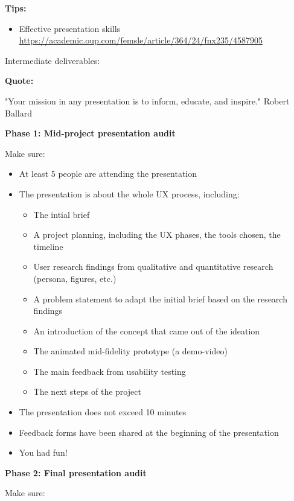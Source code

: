 \textbf{Tips:}

\begin{itemize}
\item Effective presentation skills \url{https://academic.oup.com/femsle/article/364/24/fnx235/4587905}
\end{itemize}

Intermediate deliverables:

\textbf{Quote:}

"Your mission in any presentation is to inform, educate, and inspire." Robert Ballard

\medskip

\textbf{Phase 1: Mid-project presentation audit}

Make sure:

\begin{itemize}
\item At least 5 people are attending the presentation
\item The presentation is about the whole UX process, including:
\begin{itemize}
\item The intial brief
\item A project planning, including the UX phases, the tools chosen, the timeline
\item User research findings from qualitative and quantitative research (persona, figures, etc.)
\item A problem statement to adapt the initial brief based on the research findings
\item An introduction of the concept that came out of the ideation
\item The animated mid-fidelity prototype (a demo-video)
\item The main feedback from usability testing
\item The next steps of the project
\end{itemize}
\item The presentation does not exceed 10 minutes
\item Feedback forms have been shared at the beginning of the presentation
\item You had fun!
\end{itemize}

\medskip

\textbf{Phase 2: Final presentation audit}

Make sure:

